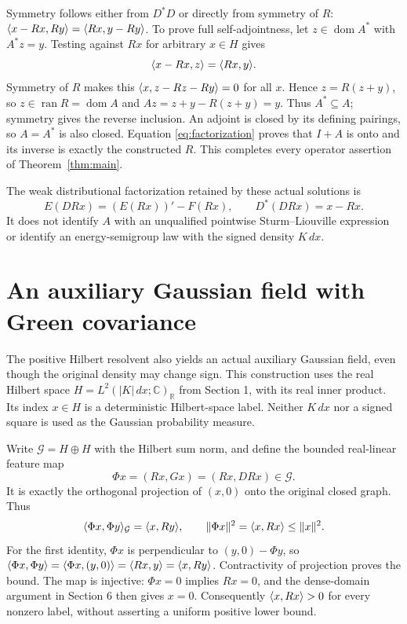 \documentclass[11pt]{article}
\newcommand{\R}{\mathbb R}\newcommand{\C}{\mathbb C}
\newcommand{\dom}{\operatorname{dom}}\newcommand{\ran}{\operatorname{ran}}
\begin{document}
Symmetry follows either from $D^*D$ or directly from symmetry
of $R$: $\langle x-Rx,Ry\rangle=\langle Rx,y-Ry\rangle$.
To prove full self-adjointness, let $z\in\dom A^*$ with
$A^*z=y$. Testing against $Rx$ for arbitrary $x\in H$ gives
\[
 \langle x-Rx,z\rangle=\langle Rx,y\rangle.
\]
Symmetry of $R$ makes this $\langle x,z-Rz-Ry\rangle=0$ for all $x$.
Hence $z=R(z+y)$, so $z\in\ran R=\dom A$ and
$Az=z+y-R(z+y)=y$. Thus $A^*\subseteq A$; symmetry gives
the reverse inclusion. An adjoint is closed by its defining
pairings, so $A=A^*$ is also closed. Equation
\eqref{eq:factorization} proves that $I+A$ is onto and its
inverse is exactly the constructed $R$. This completes every
operator assertion of Theorem~\ref{thm:main}.

The weak distributional factorization retained by these actual
solutions is
\[
 E(DRx)=(E(Rx))'-F(Rx),\qquad D^*(DRx)=x-Rx.
\]
It does not identify $A$ with an unqualified pointwise
Sturm--Liouville expression or identify an energy-semigroup
law with the signed density $K\,dx$.


\section{An auxiliary Gaussian field with Green covariance}
The positive Hilbert resolvent also yields an actual auxiliary Gaussian
field, even though the original density may change sign. This construction
uses the real Hilbert space $H=L^2(|K|\,dx;\C)_{\R}$ from Section 1,
with its real inner product. Its index $x\in H$ is a deterministic
Hilbert-space label. Neither $K\,dx$ nor a signed square is used as the
Gaussian probability measure.

Write $\mathcal G=H\oplus H$ with the Hilbert sum norm, and define the
bounded real-linear feature map
\[
 \Phi x=(Rx,Gx)=(Rx,DRx)\in\mathcal G.
\]
It is exactly the orthogonal projection of $(x,0)$ onto the original
closed graph. Thus
\begin{equation}\label{eq:featuregreen}
 \langle \Phi x,\Phi y\rangle_{\mathcal G}=\langle x,Ry\rangle,\qquad
 \|\Phi x\|^2=\langle x,Rx\rangle\leq\|x\|^2.
\end{equation}
For the first identity, $\Phi x$ is perpendicular to $(y,0)-\Phi y$, so
$\langle \Phi x,\Phi y\rangle=\langle \Phi x,(y,0)\rangle=\langle Rx,y\rangle=\langle x,Ry\rangle$.
Contractivity of projection proves the bound. The map is injective:
$\Phi x=0$ implies $Rx=0$, and the dense-domain argument in Section 6
then gives $x=0$. Consequently $\langle x,Rx\rangle>0$ for every nonzero label,
without asserting a uniform positive lower bound.
\end{document}
